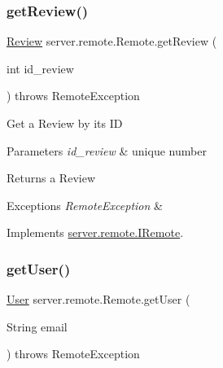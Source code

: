 \mbox{\label{classserver_1_1remote_1_1_remote_a98bd7181568c637a6cbcc0b72ebb9f95}} 
\subsubsection{\texorpdfstring{get\+Review()}{getReview()}}
{\footnotesize\ttfamily \hyperlink{classserver_1_1data_1_1_review}{Review} server.\+remote.\+Remote.\+get\+Review (\begin{DoxyParamCaption}\item[{int}]{id\+\_\+review }\end{DoxyParamCaption}) throws Remote\+Exception}

Get a Review by its ID 
\begin{DoxyParams}{Parameters}
{\em id\+\_\+review} & unique number \\
\hline
\end{DoxyParams}
\begin{DoxyReturn}{Returns}
a Review 
\end{DoxyReturn}

\begin{DoxyExceptions}{Exceptions}
{\em Remote\+Exception} & \\
\hline
\end{DoxyExceptions}


Implements \hyperlink{interfaceserver_1_1remote_1_1_i_remote_a7b3462a438579c85dc7f097acf9cec41}{server.\+remote.\+I\+Remote}.

\mbox{\label{classserver_1_1remote_1_1_remote_abef8350014445d8f2d5ffb4c088e82b6}} 
\subsubsection{\texorpdfstring{get\+User()}{getUser()}}
{\footnotesize\ttfamily \hyperlink{classserver_1_1data_1_1_user}{User} server.\+remote.\+Remote.\+get\+User (\begin{DoxyParamCaption}\item[{String}]{email }\end{DoxyParamCaption}) throws Remote\+Exception}

